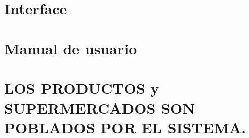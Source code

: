 \documentclass[a4paper,12pt]{report}
\begin{document}
\chapter{Interface}
\label{sec-8}

\chapter{Manual de usuario}
\label{sec-9}



\chapter{LOS PRODUCTOS y SUPERMERCADOS SON POBLADOS POR EL SISTEMA.}
\label{sec-10}
\end{document}
